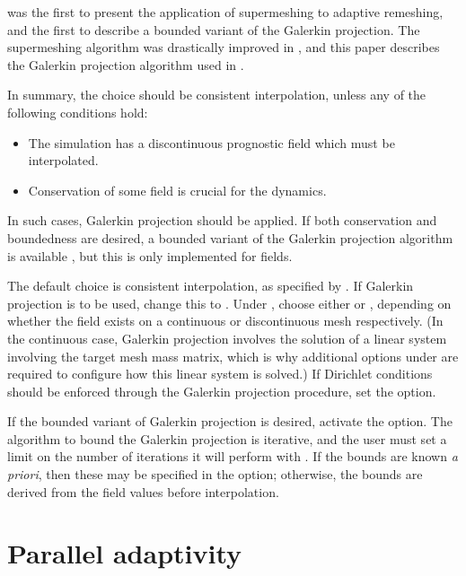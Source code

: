 \citet{farrell2009a} was the first to present the application of
supermeshing to adaptive remeshing, and the first to describe
a bounded variant of the Galerkin projection. The supermeshing
algorithm was drastically improved in \citet{farrell2009c}, and
this paper describes the Galerkin projection algorithm used in \fluidity.

In summary, the choice should be consistent interpolation, unless
any of the following conditions hold:
\begin{itemize}
\item The simulation has a discontinuous prognostic field which must be interpolated.
\item Conservation of some field is crucial for the dynamics.
\end{itemize}
In such cases, Galerkin projection should be applied. If both conservation
and boundedness are desired, a bounded variant of the Galerkin projection
algorithm is available \citep{farrell2009a}, but this is only implemented
for \Pone fields.

The default choice is consistent interpolation, as specified by
. If Galerkin projection
is to be used, change this to . Under
, choose either  or ,
depending on whether the field exists on a continuous or discontinuous mesh respectively.
(In the continuous case, Galerkin projection involves the solution of a linear system
involving the target mesh mass matrix, which is why additional options under  are required
to configure how this linear system is solved.) If Dirichlet conditions should be enforced through the Galerkin projection
procedure, set the  option.

If the bounded variant of Galerkin projection is desired, activate the 
 option. The algorithm
to bound the Galerkin projection is iterative, and the user must set a limit on the number
of iterations it will perform with . If the bounds are known
\emph{a priori}, then these may be specified in the  option; otherwise, the
bounds are derived from the field values before interpolation.

\section{Parallel adaptivity}
\label{sec:parallel_adaptivity}

